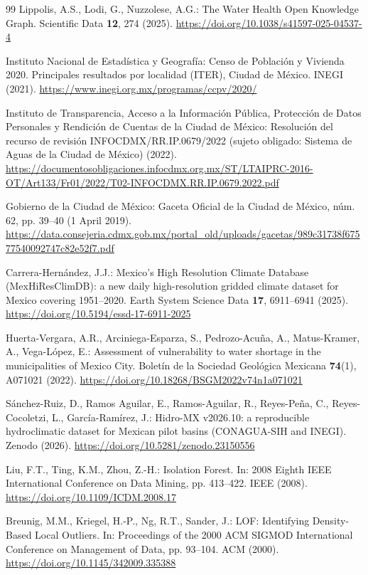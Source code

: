 \documentclass[runningheads]{llncs}
\renewcommand{\_}{\origunderscore\allowbreak}
\begin{document}
\begin{thebibliography}{99}
 Lippolis, A.S., Lodi, G., Nuzzolese, A.G.: The Water Health Open Knowledge Graph. Scientific Data \textbf{12}, 274 (2025). \url{https://doi.org/10.1038/s41597-025-04537-4}

 Instituto Nacional de Estad\'istica y Geograf\'ia: Censo de Poblaci\'on y Vivienda 2020. Principales resultados por localidad (ITER), Ciudad de M\'exico. INEGI (2021). \url{https://www.inegi.org.mx/programas/ccpv/2020/}

 Instituto de Transparencia, Acceso a la Informaci\'on P\'ublica, Protecci\'on de Datos Personales y Rendici\'on de Cuentas de la Ciudad de M\'exico: Resoluci\'on del recurso de revisi\'on INFOCDMX/RR.IP.0679/2022 (sujeto obligado: Sistema de Aguas de la Ciudad de M\'exico) (2022). \url{https://documentosobligaciones.infocdmx.org.mx/ST/LTAIPRC-2016-OT/Art133/Fr01/2022/T02-INFOCDMX.RR.IP.0679.2022.pdf}

 Gobierno de la Ciudad de M\'exico: Gaceta Oficial de la Ciudad de M\'exico, n\'um. 62, pp. 39--40 (1 April 2019). \url{https://data.consejeria.cdmx.gob.mx/portal_old/uploads/gacetas/989c31738f67577540092747c82e52f7.pdf}

 Carrera-Hern\'andez, J.J.: Mexico's High Resolution Climate Database (MexHiResClimDB): a new daily high-resolution gridded climate dataset for Mexico covering 1951--2020. Earth System Science Data \textbf{17}, 6911--6941 (2025). \url{https://doi.org/10.5194/essd-17-6911-2025}

 Huerta-Vergara, A.R., Arciniega-Esparza, S., Pedrozo-Acu\~na, A., Matus-Kramer, A., Vega-L\'opez, E.: Assessment of vulnerability to water shortage in the municipalities of Mexico City. Bolet\'in de la Sociedad Geol\'ogica Mexicana \textbf{74}(1), A071021 (2022). \url{https://doi.org/10.18268/BSGM2022v74n1a071021}

 S\'anchez-Ruiz, D., Ramos Aguilar, E., Ramos-Aguilar, R., Reyes-Pe\~na, C., Reyes-Cocoletzi, L., Garc\'ia-Ram\'irez, J.: Hidro-MX v2026.10: a reproducible hydroclimatic dataset for Mexican pilot basins (CONAGUA-SIH and INEGI). Zenodo (2026). \url{https://doi.org/10.5281/zenodo.23150556}

 Liu, F.T., Ting, K.M., Zhou, Z.-H.: Isolation Forest. In: 2008 Eighth IEEE International Conference on Data Mining, pp. 413--422. IEEE (2008). \url{https://doi.org/10.1109/ICDM.2008.17}

 Breunig, M.M., Kriegel, H.-P., Ng, R.T., Sander, J.: LOF: Identifying Density-Based Local Outliers. In: Proceedings of the 2000 ACM SIGMOD International Conference on Management of Data, pp. 93--104. ACM (2000). \url{https://doi.org/10.1145/342009.335388}


\end{thebibliography}
\end{document}
